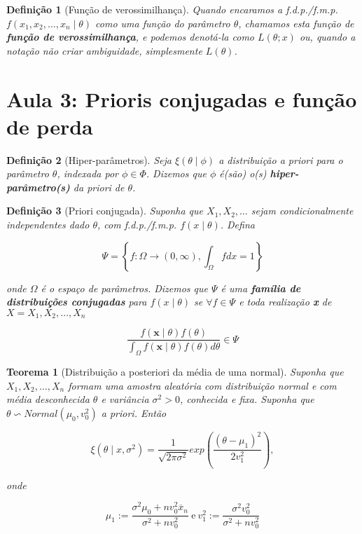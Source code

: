\documentclass{article}
\newtheorem{theorem}{Teorema}
\newtheorem{definition}{Definição}
\begin{document}
\begin{definition}[Função de verossimilhança]
Quando encaramos a f.d.p./f.m.p. $f(x_1, x_2, \ldots, x_n \mid \theta)$ como uma função do parâmetro $\theta$, chamamos esta função de \textbf{função de verossimilhança}, e podemos denotá-la como $L(\theta; x)$ ou, quando a notação não criar ambiguidade, simplesmente $L(\theta)$.
\end{definition}

\section*{Aula 3: Prioris conjugadas e função de perda}
\label{s3}
\begin{definition}[Hiper-parâmetros]
Seja $\xi(\theta \mid \phi)$ a distribuição a priori para o parâmetro $\theta$, indexada por $\phi \in \Phi$. Dizemos que $\phi$ é(são) o(s) \textbf{hiper-parâmetro(s)} da priori de $\theta$.
\end{definition}

\begin{definition}[Priori conjugada]
Suponha que $X_1, X_2, \ldots$ sejam condicionalmente independentes dado $\theta$, com f.d.p./f.m.p. $f(x\mid\theta)$. Defina

\begin{equation}
\Psi = \left \{ f: \Omega \rightarrow (0, \infty), \int_\Omega f dx = 1 \right \}
\end{equation}

onde $\Omega$ é o espaço de parâmetros. Dizemos que $\Psi$ é uma \textbf{família de distribuições conjugadas} para $f(x \mid \theta)$ se $\forall f \in \Psi$ e toda realização \textbf{x} de $X = X_1, X_2, \ldots, X_n$

\begin{equation}
\frac{f(\textbf{x} \mid \theta) f(\theta)}{\int_\Omega f(\textbf{x} \mid \theta)f(\theta) d \theta} \in \Psi
\end{equation}
\end{definition}

\begin{theorem}[Distribuição a posteriori da média de uma normal]
Suponha que $X_1, X_2, \ldots, X_n$ formam uma amostra aleatória com distribuição normal e com média desconhecida $\theta$ e variância $\sigma^2 > 0$, conhecida e fixa. Suponha que $\theta \backsim Normal(\mu_0, v_0^2)$ a priori. Então

\begin{equation}
\xi (\theta \mid x, \sigma^2) = \frac{1}{\sqrt{2 \pi \sigma^2}} exp \left (\frac{(\theta - \mu_1)^2}{2v_1^2}\right ),
\end{equation}

onde

\begin{equation}
\mu_1 := \frac{\sigma^2 \mu_0 + n v_0^2 \overline{x}_n}{\sigma^2 + n v_ 0^2} \ \mathrm{e} \ v_1^2 := \frac{\sigma^2 v_0^2}{\sigma^2 + n v_0^2}
\end{equation}
\end{theorem}
\end{document}

